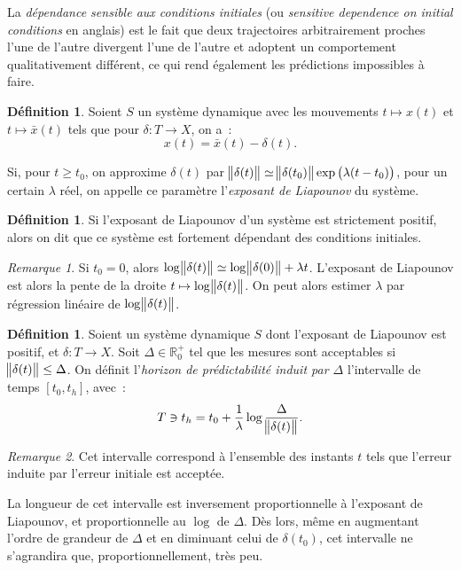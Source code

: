 \documentclass{article}
\theoremstyle{definition}
\newtheorem{déf}[thm]{Définition}
\theoremstyle{remark}
\newtheorem*{rmq}{Remarque}
\newcommand{\R}{\mathbb R}
\begin{document}
	La \textit{dépendance sensible aux conditions initiales} (ou \textit{sensitive dependence on initial conditions} en anglais) est le fait que deux trajectoires
	arbitrairement proches l'une de l'autre divergent l'une de l'autre et adoptent un comportement qualitativement différent, ce qui rend également les
	prédictions impossibles à faire.

	\begin{déf} Soient $S$ un système dynamique avec les mouvements $t \mapsto x(t)$ et $t \mapsto \bar x(t)$ tels que pour $\delta : T \to X$, on a~:
	\[x(t) = \bar x(t) - \delta(t).\]

	Si, pour $t \geq t_0$, on approxime $\delta(t)$ par $\norm {\delta(t)} \simeq \norm {\delta(t_0)}\exp\left(\lambda(t-t_0)\right)$, pour un certain $\lambda$
	réel, on appelle ce paramètre l'\textit{exposant de Liapounov} du système.
	\end{déf}

	\begin{déf} Si l'exposant de Liapounov d'un système est strictement positif, alors on dit que ce système est fortement dépendant des conditions initiales.
	\end{déf}

	\begin{rmq} Si $t_0 = 0$, alors $\log \norm {\delta(t)} \simeq \log \norm {\delta(0)} + \lambda t$. L'exposant de Liapounov est alors la pente de la droite
	$t \mapsto \log \norm {\delta(t)}$. On peut alors estimer $\lambda$ par régression linéaire de $\log \norm {\delta(t)}$.
	\end{rmq}

	\begin{déf} Soient un système dynamique $S$ dont l'exposant de Liapounov est positif, et $\delta : T \to X$. Soit $\Delta \in \R_0^+$ tel que les mesures
	sont acceptables si $\norm {\delta(t)} \leq \Delta$. On définit l'\textit{horizon de prédictabilité induit par $\Delta$} l'intervalle de temps $[t_0, t_h]$,
	avec~:
	\[T \ni t_h = t_0 + \frac 1\lambda \log\frac \Delta{\norm {\delta(t)}}.\]
	\end{déf}

	\begin{rmq} Cet intervalle correspond à l'ensemble des instants $t$ tels que l'erreur induite par l'erreur initiale est acceptée.

	La longueur de cet intervalle est inversement proportionnelle à l'exposant de Liapounov, et proportionnelle au $\log$ de $\Delta$. Dès lors, même en
	augmentant l'ordre de grandeur de $\Delta$ et en diminuant celui de $\delta(t_0)$, cet intervalle ne s'agrandira que, proportionnellement, très peu.
	\end{rmq}
\end{document}
